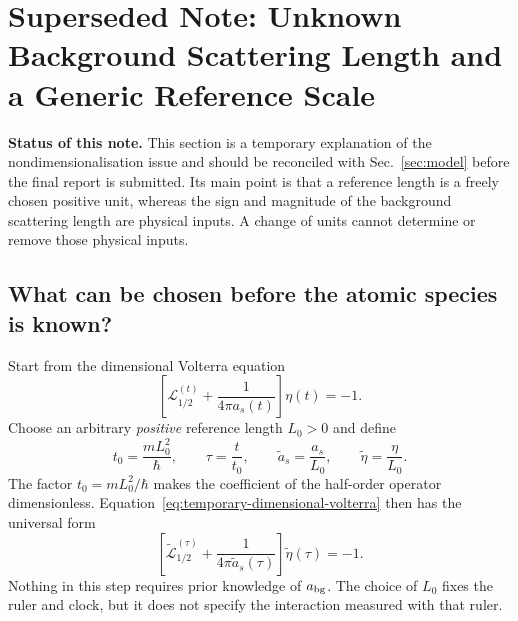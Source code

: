 \documentclass[9pt,a4paper,twocolumn,twoside]{rho-class/rho}
\begin{document}
\iffalse
\section{Superseded Note: Unknown Background Scattering Length and a Generic Reference Scale}
\label{app:temporary-generic-length-scale}

    \textbf{Status of this note.} This section is a temporary explanation of the
    nondimensionalisation issue and should be reconciled with
    Sec.~\ref{sec:model} before the final report is submitted.  Its main point is
    that a reference length is a freely chosen positive unit, whereas the sign
    and magnitude of the background scattering length are physical inputs.  A
    change of units cannot determine or remove those physical inputs.

    \subsection{What can be chosen before the atomic species is known?}

        Start from the dimensional Volterra equation
        \begin{equation}\label{eq:temporary-dimensional-volterra}
            \left[
                \mathcal L_{1/2}^{(t)}
                +\frac{1}{4\pi a_s(t)}
            \right]\eta(t)=-1.
        \end{equation}
        Choose an arbitrary \emph{positive} reference length $L_0>0$ and define
        \begin{equation}\label{eq:temporary-generic-scales}
            t_0=\frac{mL_0^2}{\hbar},\qquad
            \tau=\frac{t}{t_0},\qquad
            \widetilde a_s=\frac{a_s}{L_0},\qquad
            \widetilde\eta=\frac{\eta}{L_0}.
        \end{equation}
        The factor $t_0=mL_0^2/\hbar$ makes the coefficient of the
        half-order operator dimensionless.  Equation~\eqref{eq:temporary-dimensional-volterra}
        then has the universal form
        \begin{equation}\label{eq:temporary-generic-volterra}
            \left[
                \widetilde{\mathcal L}_{1/2}^{(\tau)}
                +\frac{1}{4\pi\widetilde a_s(\tau)}
            \right]\widetilde\eta(\tau)=-1.
        \end{equation}
        Nothing in this step requires prior knowledge of $a_{\rm bg}$.  The
        choice of $L_0$ fixes the ruler and clock, but it does not specify the
        interaction measured with that ruler.
\end{document}
